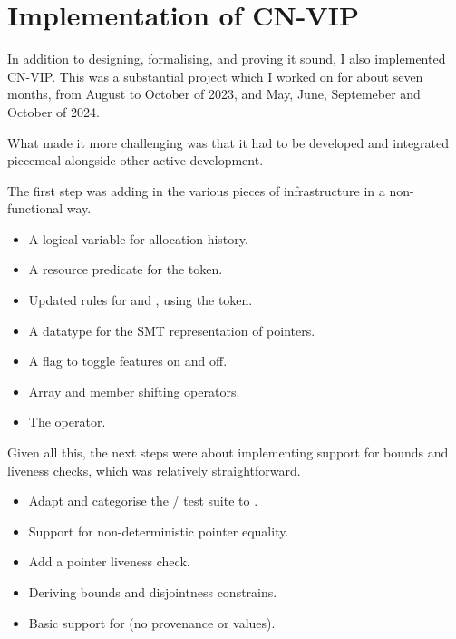 \chapter{Implementation of CN-VIP}

\margintoc{}

In addition to designing, formalising, and proving it sound, I also implemented
CN-VIP\@. This was a substantial project which I worked on for about seven
months, from August to October of 2023, and May, June, Septemeber and October
of 2024.

What made it more challenging was that it had to be developed and integrated
piecemeal alongside other active  development.

The first step was adding in the various pieces of infrastructure in a non-functional way.
\begin{itemize}
    \item A logical variable for allocation history.
    \item A resource predicate for the  token.
    \item Updated rules for  and , using the  token.
    \item A datatype for the SMT representation of pointers.
    \item A flag to toggle  features on and off.
    \item Array and member shifting operators.
    \item The  operator.
\end{itemize}

Given all this, the next steps were about implementing support for bounds and
liveness checks, which was relatively straightforward.
\begin{itemize}
    \item Adapt and categorise the / test suite to \@.
    \item Support for non-deterministic pointer equality.
    \item Add a pointer liveness check.
    \item Deriving bounds and disjointness constrains.
    \item Basic support for  (no provenance or
         values).
\end{itemize}

